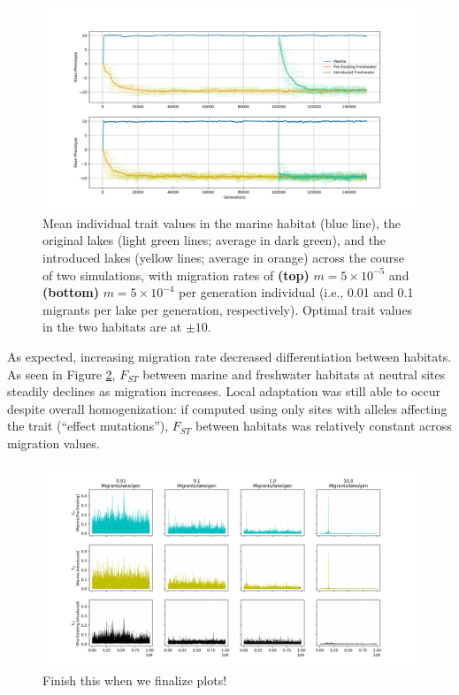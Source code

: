 \documentclass{article}
\begin{document}
\begin{figure}
	\begin{center}
        \includegraphics[width=1.0\linewidth]{semi_final_plots/Pheno_semi_final.png}
  		\caption{ 
        Mean individual trait values in the marine habitat (blue line),
        the original lakes (light green lines; average in dark green),
        and the introduced lakes (yellow lines; average in orange)
        across the course of two simulations, with migration rates of
        \textbf{(top)} $m=5 \times 10^{-5}$ and
        \textbf{(bottom)} $m=5 \times 10^{-4}$ per generation individual
        (i.e., 0.01 and 0.1 migrants per lake per generation, respectively).
        Optimal trait values in the two habitats are at $\pm 10$.
		}
  		\label{fig:phenotype_ts2}
	\end{center}
\end{figure}


As expected, increasing migration rate decreased differentiation between habitats.
As seen in Figure \ref{fig:Fst},
$F_{ST}$ between marine and freshwater habitats at neutral sites 
steadily declines as migration increases.
Local adaptation was still able to occur despite overall homogenization:
if computed using only sites with alleles affecting the trait (``effect mutations''),
$F_{ST}$ between habitats was relatively constant across migration values.


\begin{figure}
	\begin{center}
  		\includegraphics[width=1.0\linewidth]{semi_final_plots/Fst_semi_final.png}
  		\caption{
		Finish this when we finalize plots!
		 }
  		\label{fig:Fst}
	\end{center}
\end{figure}
\end{document}
